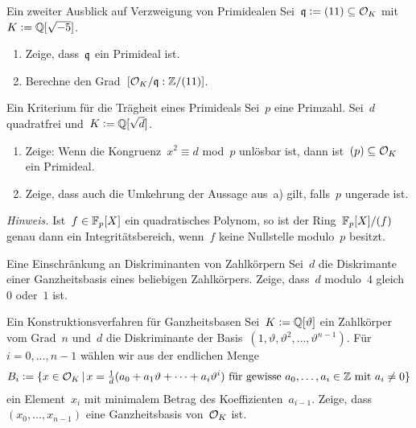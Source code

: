 \documentclass{uebblatt}
\begin{document}

\begin{aufgabe}{Ein zweiter Ausblick auf Verzweigung von Primidealen}
Sei~$\mathfrak{q} \vcentcolon= (11) \subseteq \mathcal{O}_K$ mit~$K \vcentcolon= \mathbb{Q}[\sqrt{-5}]$.
\begin{multicols}{2}
\begin{enumerate}
\item Zeige, dass~$\mathfrak{q}$ ein Primideal ist.
\item Berechne den Grad~$[\mathcal{O}_K/\mathfrak{q} : \mathbb{Z}/(11)]$.
\end{enumerate}
\end{multicols}
\vspace{-1em}
\end{aufgabe}

\begin{aufgabe}{Ein Kriterium für die Trägheit eines Primideals}
Sei~$p$ eine Primzahl. Sei~$d$ quadratfrei und~$K \vcentcolon= \mathbb{Q}[\sqrt{d}]$.
\begin{enumerate}
\item Zeige: Wenn die Kongruenz~$x^2 \equiv d$ mod~$p$ unlösbar ist,
dann ist~$(p) \subseteq \mathcal{O}_K$ ein Primideal.
\item Zeige, dass auch die Umkehrung der Aussage aus~a) gilt, falls~$p$
ungerade ist.
\end{enumerate}
{\tiny\emph{Hinweis.} Ist~$f \in \mathbb{F}_p[X]$ ein quadratisches Polynom, so ist
der Ring~$\mathbb{F}_p[X]/(f)$ genau dann ein Integritätsbereich, wenn~$f$ keine
Nullstelle modulo~$p$ besitzt.\par}
\end{aufgabe}

\begin{aufgabe}{Eine Einschränkung an Diskriminanten von Zahlkörpern}
Sei~$d$ die Diskrimante einer Ganzheitsbasis eines beliebigen Zahlkörpers.
Zeige, dass~$d$ modulo~$4$ gleich~$0$ oder~$1$ ist.
\end{aufgabe}

\begin{aufgabe}{Ein Konstruktionsverfahren für Ganzheitsbasen}
Sei~$K \vcentcolon= \mathbb{Q}[\vartheta]$ ein Zahlkörper vom Grad~$n$ und~$d$ die
Diskriminante der Basis~$(1,\vartheta,\vartheta^2,\ldots,\vartheta^{n-1})$.
Für~$i = 0, \ldots, {n-1}$ wählen wir aus der endlichen Menge
\[ B_i \vcentcolon= \{ x \in \mathcal{O}_K \,|\,
  \text{$x = \tfrac{1}{d}(a_0 + a_1\vartheta + \cdots +
  a_i\vartheta^i)$ für gewisse~$a_0,\ldots,a_i \in \mathbb{Z}$ mit~$a_i
  \neq 0$} \} \]
ein Element~$x_i$ mit minimalem Betrag des Koeffizienten~$a_{i-1}$. Zeige,
dass~$(x_0,\ldots,x_{n-1})$ eine Ganzheitsbasis von~$\mathcal{O}_K$ ist.
\end{aufgabe}
\end{document}
